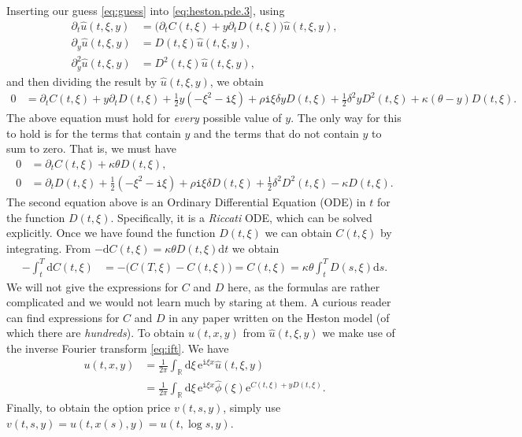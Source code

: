 \documentclass[12pt]{book}
\let\varphi\phi
\numberwithin{equation}{chapter}
\theoremstyle{plain}
\numberwithin{theorem}{section}
\theoremstyle{definition}
\numberwithin{exercise}{chapter}
\newcommand{\<}{\langle}
\renewcommand{\>}{\rangle}
\renewcommand{\(}{\left(}
\renewcommand{\)}{\right)}
\renewcommand{\[}{\left[}
\renewcommand{\]}{\right]}
\newcommand\Rb{\mathds{R}}
\newcommand\del{\delta}
\newcommand\uh{\widehat{u}}
\renewcommand\d{\partial}
\newcommand\ii{\mathtt{i}}
\newcommand\dd{\mathrm{d}}
\newcommand\ee{\mathrm{e}}
\theoremstyle{definition}
\numberwithin{question}{section}
\begin{document}
Inserting our guess \eqref{eq:guess} into \eqref{eq:heston.pde.3}, using
\begin{align}
\d_t \uh(t,\xi,y)
	&=	\big(\d_t C(t,\xi) + y \d_t D(t,\xi) \big) \uh(t,\xi,y) , \\
\d_y \uh(t,\xi,y)
	&=	D(t,\xi) \uh(t,\xi,y) , \\
\d_y^2 \uh(t,\xi,y)
	&=	D^2(t,\xi) \uh(t,\xi,y) , 
\end{align}
and then dividing the result by $\uh(t,\xi,y)$, we obtain
\begin{align}
0
	&=	\d_t C(t,\xi) + y \d_t D(t,\xi) + \tfrac{1}{2} y (- \xi^2 - \ii \xi ) + \rho \ii \xi \del y D(t,\xi) 
			+ \tfrac{1}{2} \delta^2 y D^2(t,\xi) + \kappa (\theta - y) D(t,\xi) .
\end{align}
The above equation must hold for \textit{every} possible value of $y$.    The only way for this to hold is for the terms that contain $y$ and the terms that do not contain $y$ to sum to zero.  That is, we must have
\begin{align}
0
	&=	\d_t C(t,\xi)  + \kappa \theta D(t,\xi), \\
0
	&=	\d_t D(t,\xi) + \tfrac{1}{2} (- \xi^2 - \ii \xi ) + \rho \ii \xi \del D(t,\xi)  + \tfrac{1}{2} \delta^2 D^2(t,\xi) - \kappa D(t,\xi) .
\end{align}
The second equation above is an Ordinary Differential Equation (ODE) in $t$ for the function $D(t,\xi)$.  Specifically, it is a \textit{Riccati} ODE, which can be solved explicitly.  Once we have found the function $D(t,\xi)$ we can obtain $C(t,\xi)$ by integrating.  From 
$ -\dd C(t,\xi)  = \kappa \theta D(t,\xi) \dd t $
we obtain
\begin{align}
- \int_t^T \dd C(t,\xi)
	&=	- \Big( C(T,\xi) - C(t,\xi) \Big)
	=		C(t,\xi) 
	=	 \kappa \theta \int_t^T D(s,\xi) \dd s .
\end{align}
We will not give the expressions for $C$ and $D$ here, as the formulas are rather complicated and we would not learn much by staring at them.  
A curious reader can find expressions for $C$ and $D$ in any paper written on the Heston model (of which there are \textit{hundreds}).
To obtain $u(t,x,y)$ from $\uh(t,\xi,y)$ we make use of the inverse Fourier transform \eqref{eq:ift}.  We have
\begin{align}
u(t,x,y)
	&=	\frac{1}{2 \pi} \int_\Rb \dd \xi \, \ee^{\ii \xi x} \uh(t,\xi,y) \\
	&=	\frac{1}{2 \pi} \int_\Rb \dd \xi \, \ee^{\ii \xi x} \widehat{\varphi}(\xi)\ee^{C(t,\xi) + y D(t,\xi)} .
\end{align}
Finally, to obtain the option price $v(t,s,y)$, simply use $v(t,s,y) = u(t,x(s),y) =  u(t,\log s,y)$.
\end{document}
